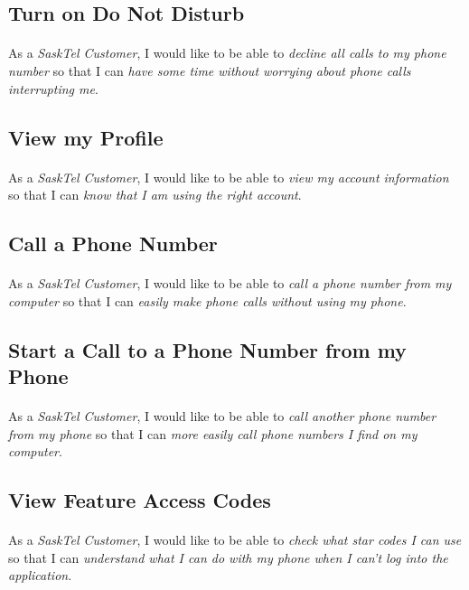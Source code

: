 \documentclass[12pt]{article}
\begin{document}
\subsection{Turn on Do Not Disturb}
\paragraph{}	As a \textit{SaskTel Customer}, I would like to be able to \textit{decline all calls to my phone number} so that I can \textit{have some time without worrying about phone calls interrupting me}.

\subsection{View my Profile}
\paragraph{}	As a \textit{SaskTel Customer}, I would like to be able to \textit{view my account information} so that I can \textit{know that I am using the right account}.

\subsection{Call a Phone Number}
\paragraph{}	As a \textit{SaskTel Customer}, I would like to be able to \textit{call a phone number from my computer} so that I can \textit{easily make phone calls without using my phone}.

\subsection{Start a Call to a Phone Number from my Phone}
\paragraph{}	As a \textit{SaskTel Customer}, I would like to be able to \textit{call another phone number from my phone} so that I can \textit{more easily call phone numbers I find on my computer}.

\subsection{View Feature Access Codes}
\paragraph{}	As a \textit{SaskTel Customer}, I would like to be able to \textit{check what star codes I can use} so that I can \textit{understand what I can do with my phone when I can't log into the application}.
\end{document}
